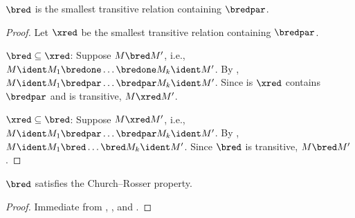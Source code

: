 \documentclass[../../../include/open-logic-section]{subfiles}
\begin{document}
\begin{lem}
  $\bred$ is the smallest transitive relation containing $\bredpar$.
\end{lem}

\begin{proof}
  Let $\xred$ be the smallest transitive relation containing
  $\bredpar$.

  $\bred \subseteq \xred$: Suppose $M \bred M'$, i.e., $M \ident M_1
  \bredone \dots \bredone M_k \ident M'$. By , $M
  \ident M_1 \bredpar \dots \bredpar M_k \ident M'$. Since is $\xred$
  contains $\bredpar$ and is transitive, $M \xred M'$.

  $\xred \subseteq \bred$: Suppose $M \xred M'$, i.e., $M
  \ident M_1 \bredpar \dots \bredpar M_k \ident M'$. By , $M \ident M_1
  \bred \dots \bred M_k \ident M'$. Since $\bred$ is transitive, $M
  \bred M'$.
\end{proof}

\begin{thm}
  $\bred$ satisfies the Church--Rosser property.
\end{thm}

\begin{proof}
  Immediate from , , and .
\end{proof}
\end{document}

